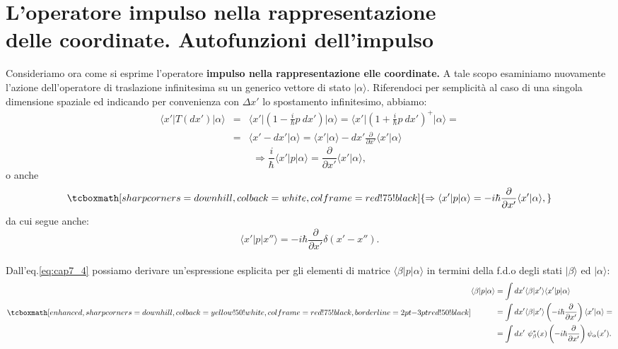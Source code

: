 \section[L'operatore impulso nella rappresentazione delle coordinate. Autofunzioni dell'impulso]{L'operatore impulso nella rappresentazione \\delle coordinate. Autofunzioni dell'impulso}
Consideriamo ora come si esprime l'operatore \textbf{impulso nella rappresentazione elle coordinate.} A tale scopo esaminiamo nuovamente l'azione dell'operatore di traslazione infinitesima su un generico vettore di stato $\vert \alpha \rangle$. Riferendoci per semplicità al caso di una singola dimensione spaziale ed indicando per convenienza con $\Delta x'$ lo spostamento infinitesimo, abbiamo:
	\begin{eqnarray}
		\langle x' \vert T(dx') \vert \alpha \rangle 
		& = & \langle x' \vert \left(1-\frac{i}{\hbar}p\ dx'\right) \vert \alpha \rangle = \langle x' \vert \left(1+\frac{i}{\hbar}p\ dx'\right) ^+ \vert \alpha \rangle = \nonumber \\
		& = & \langle x'-dx'\vert \alpha \rangle = \langle x'\vert \alpha \rangle  - dx' \frac{\partial}{\partial x'} \langle x'\vert \alpha \rangle 
	\end{eqnarray}
	\begin{equation}
		 \Rightarrow \frac{i}{\hbar}\langle x'\vert p \vert \alpha \rangle = \frac{\partial}{\partial x'}\langle x'\vert \alpha \rangle ,
	\end{equation}
o anche
	\begin{equation}
		\label{eq:cap7_4}
		\tcboxmath[sharp corners=downhill ,colback=white,colframe=red!75!black]{
			\Rightarrow \langle x'\vert p \vert \alpha \rangle =-i\hbar\frac{\partial}{\partial x'}\langle x'\vert \alpha \rangle ,
			}
	\end{equation}
da cui segue anche:
	\begin{equation}
		\langle x'\vert p \vert x'' \rangle =-i\hbar\frac{\partial}{\partial x'}\delta (x'-x'').
	\end{equation}\\
	
Dall'eq.\eqref{eq:cap7_4} possiamo derivare un'espressione esplicita per gli elementi di matrice $\langle \beta \vert p\vert \alpha \rangle $ in termini della f.d.o degli stati $\vert \beta \rangle $ ed $\vert \alpha \rangle $:
	\begin{equation}
		\label{eq:cap7_5}
		\tcboxmath[enhanced,sharp corners=downhill ,colback=yellow!50!white,colframe=red!75!black, borderline={2pt}{-3pt}{red!50!black}]{
		\begin{aligned}
			\langle \beta \vert p \vert \alpha \rangle &= \int dx' \langle \beta \vert x' \rangle \langle x' \vert p \vert \alpha \rangle\\ &= \int dx' 	\langle \beta \vert x' \rangle \left( -i\hbar \frac{\partial}{\partial x'}\right) \langle x' \vert \alpha \rangle = \\
& = \int dx' \ \psi _{\beta} ^* (x) \left( -i\hbar \frac{\partial}{\partial x'}\right) \psi _{\alpha}  (x') .
		\end{aligned}
		}
	\end{equation}\\
	
